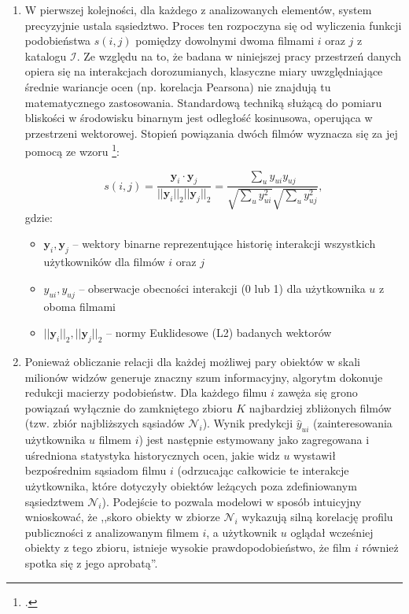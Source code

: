 \begin{enumerate}
    \item W pierwszej kolejności, dla każdego z analizowanych elementów, system precyzyjnie ustala sąsiedztwo. Proces ten rozpoczyna się od wyliczenia funkcji podobieństwa $s(i, j)$ pomiędzy dowolnymi dwoma filmami $i$ oraz $j$ z katalogu $\mathcal{I}$. Ze względu na to, że badana w niniejszej pracy przestrzeń danych opiera się na interakcjach dorozumianych, klasyczne miary uwzględniające średnie wariancje ocen (np. korelacja Pearsona) nie znajdują tu matematycznego zastosowania. Standardową techniką służącą do pomiaru bliskości w środowisku binarnym jest odległość kosinusowa, operująca w przestrzeni wektorowej. Stopień powiązania dwóch filmów wyznacza się za jej pomocą ze wzoru \footcite[16]{balchanowskiEwolucyjnaAgregacjaRang2023}:

          \begin{equation}
              s(i,j) = \frac{\mathbf{y}_i \cdot \mathbf{y}_j}{||\mathbf{y}_i||_2||\mathbf{y}_j||_2} = \frac{\sum_u y_{ui}y_{uj}}{\sqrt{\sum_u y_{ui}^2}\sqrt{\sum_u y_{uj}^2}},
          \end{equation}
          gdzie:
          \begin{itemize}
              \item $\mathbf{y}_i, \mathbf{y}_j$ -- wektory binarne reprezentujące historię interakcji wszystkich użytkowników dla filmów \allowbreak $i$ oraz $j$
              \item $y_{ui}, y_{uj}$ -- obserwacje obecności interakcji (0 lub 1) dla użytkownika $u$ z oboma filmami
              \item $||\mathbf{y}_i||_2, ||\mathbf{y}_j||_2$ -- normy Euklidesowe (L2) badanych wektorów
          \end{itemize}

    \item Ponieważ obliczanie relacji dla każdej możliwej pary obiektów w skali milionów widzów generuje znaczny szum informacyjny, algorytm dokonuje redukcji macierzy podobieństw. Dla każdego filmu $i$ zawęża się grono powiązań wyłącznie do zamkniętego zbioru $K$ najbardziej zbliżonych filmów (tzw. zbiór najbliższych sąsiadów $\mathcal{N}_i$). Wynik predykcji $\hat{y}_{ui}$ (zainteresowania użytkownika $u$ filmem $i$) jest następnie estymowany jako zagregowana i uśredniona statystyka historycznych ocen, jakie widz $u$ wystawił bezpośrednim sąsiadom filmu $i$ (odrzucając całkowicie te interakcje użytkownika, które dotyczyły obiektów leżących poza zdefiniowanym sąsiedztwem $\mathcal{N}_i$). Podejście to pozwala modelowi w sposób intuicyjny wnioskować, że ,,skoro obiekty w zbiorze $\mathcal{N}_i$ wykazują silną korelację profilu publiczności z analizowanym filmem $i$, a użytkownik $u$ oglądał wcześniej obiekty z tego zbioru, istnieje wysokie prawdopodobieństwo, że film $i$ również spotka się z jego aprobatą''.


\end{enumerate}
